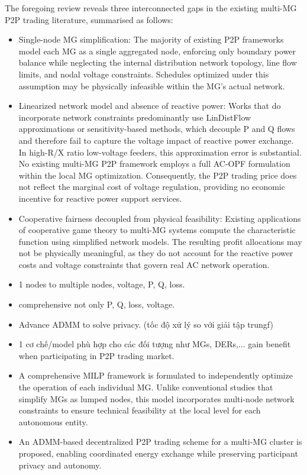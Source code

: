 \documentclass[preprint,12pt]{elsarticle}
\begin{document}
The foregoing review reveals three interconnected gaps in the existing multi-MG P2P trading literature, summarised as follows:
\begin{itemize}
    \item Single-node MG simplification: The majority of existing P2P frameworks model each MG as a single aggregated node, enforcing only boundary power balance while neglecting the internal distribution network topology, line flow limits, and nodal voltage constraints. Schedules optimized under this assumption may be physically infeasible within the MG's actual network.
    \item Linearized network model and absence of reactive power: Works that do incorporate network constraints predominantly use LinDistFlow approximations or sensitivity-based methods, which decouple P and Q flows and therefore fail to capture the voltage impact of reactive power exchange. In high-R/X ratio low-voltage feeders, this approximation error is substantial. No existing multi-MG P2P framework employs a full AC-OPF formulation within the local MG optimization. Consequently, the P2P trading price does not reflect the marginal cost of voltage regulation, providing no economic incentive for reactive power support services.
    \item Cooperative fairness decoupled from physical feasibility: Existing applications of cooperative game theory to multi-MG systems compute the characteristic function using simplified network models. The resulting profit allocations may not be physically meaningful, as they do not account for the reactive power costs and voltage constraints that govern real AC network operation.
    \item 1 nodes to multiple nodes, voltage, P, Q, loss.
    \item comprehensive not only P, Q, loss, voltage. 
    \item Advance ADMM to solve privacy. (tốc độ xử lý so với giải tập trungf)
    \item 1 cơ chế/model phù hợp cho các đối tượng như MGs, DERs,... gain benefit when participating in P2P trading market.
\end{itemize}

\begin{itemize}
    \item A comprehensive MILP framework is formulated to independently optimize the operation of each individual MG. Unlike conventional studies that simplify MGs as lumped nodes, this model incorporates multi-node network constraints to ensure technical feasibility at the local level for each autonomous entity.
    \item An ADMM-based decentralized P2P trading scheme for a multi-MG cluster is proposed, enabling coordinated energy exchange while preserving participant privacy and autonomy.
\end{itemize}
\end{document}
